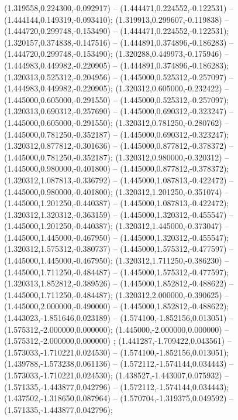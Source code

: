  (1.319558,0.224300,-0.092917) -- (1.444471,0.224552,-0.122531) -- (1.444144,0.149319,-0.093410);
 (1.319913,0.299607,-0.119838) -- (1.444720,0.299748,-0.153490) -- (1.444471,0.224552,-0.122531);
 (1.320157,0.374838,-0.147516) -- (1.444891,0.374896,-0.186283) -- (1.444720,0.299748,-0.153490);
 (1.320288,0.449973,-0.175946) -- (1.444983,0.449982,-0.220905) -- (1.444891,0.374896,-0.186283);
 (1.320313,0.525312,-0.204956) -- (1.445000,0.525312,-0.257097) -- (1.444983,0.449982,-0.220905);
 (1.320312,0.605000,-0.232422) -- (1.445000,0.605000,-0.291550) -- (1.445000,0.525312,-0.257097);
 (1.320313,0.690312,-0.257690) -- (1.445000,0.690312,-0.323247) -- (1.445000,0.605000,-0.291550);
 (1.320312,0.781250,-0.280762) -- (1.445000,0.781250,-0.352187) -- (1.445000,0.690312,-0.323247);
 (1.320312,0.877812,-0.301636) -- (1.445000,0.877812,-0.378372) -- (1.445000,0.781250,-0.352187);
 (1.320312,0.980000,-0.320312) -- (1.445000,0.980000,-0.401800) -- (1.445000,0.877812,-0.378372);
 (1.320312,1.087813,-0.336792) -- (1.445000,1.087813,-0.422472) -- (1.445000,0.980000,-0.401800);
 (1.320312,1.201250,-0.351074) -- (1.445000,1.201250,-0.440387) -- (1.445000,1.087813,-0.422472);
 (1.320312,1.320312,-0.363159) -- (1.445000,1.320312,-0.455547) -- (1.445000,1.201250,-0.440387);
 (1.320312,1.445000,-0.373047) -- (1.445000,1.445000,-0.467950) -- (1.445000,1.320312,-0.455547);
 (1.320312,1.575312,-0.380737) -- (1.445000,1.575312,-0.477597) -- (1.445000,1.445000,-0.467950);
 (1.320312,1.711250,-0.386230) -- (1.445000,1.711250,-0.484487) -- (1.445000,1.575312,-0.477597);
 (1.320313,1.852812,-0.389526) -- (1.445000,1.852812,-0.488622) -- (1.445000,1.711250,-0.484487);
 (1.320312,2.000000,-0.390625) -- (1.445000,2.000000,-0.490000) -- (1.445000,1.852812,-0.488622);
 (1.443023,-1.851646,0.023189) -- (1.574100,-1.852156,0.013051) -- (1.575312,-2.000000,0.000000);
 (1.445000,-2.000000,0.000000) -- (1.575312,-2.000000,0.000000) ;
 (1.441287,-1.709422,0.043561) -- (1.573033,-1.710221,0.024530) -- (1.574100,-1.852156,0.013051);
 (1.439788,-1.573238,0.061136) -- (1.572112,-1.574144,0.034443) -- (1.573033,-1.710221,0.024530);
 (1.438527,-1.443007,0.075932) -- (1.571335,-1.443877,0.042796) -- (1.572112,-1.574144,0.034443);
 (1.437502,-1.318650,0.087964) -- (1.570704,-1.319375,0.049592) -- (1.571335,-1.443877,0.042796);
